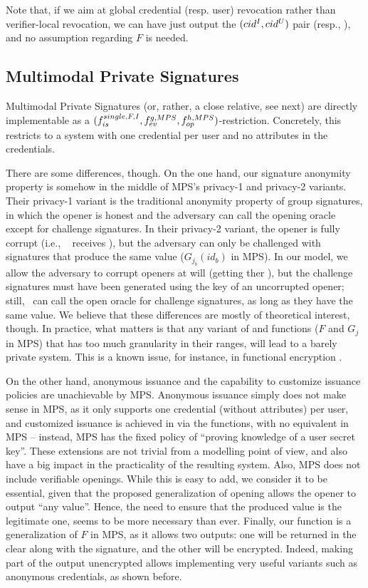 Note that, if we aim at global credential (resp. user) revocation rather than
verifier-local revocation, we can have \finsp just output the $(cid^I,cid^U)$
pair (resp., \upk), and no assumption regarding $F$ is needed.

\subsection{Multimodal Private Signatures}
\label{ssec:related-models-mps}

Multimodal Private Signatures (or, rather, a close relative, see next) are
directly implementable as a $(f_{is}^{single,F,I},f_{ev}^{g,MPS},
f_{op}^{h,MPS})$-\CUASGen restriction. Concretely, this restricts to a system
with one credential per user and no attributes in the credentials.

There are some differences, though. On the one hand, our signature anonymity
property is somehow in the middle of MPS's privacy-1 and privacy-2 variants.
Their privacy-1 variant is the traditional anonymity property of group
signatures, in which the opener is honest and the adversary can call the opening
oracle except for challenge signatures. In their privacy-2 variant, the opener
is fully corrupt (i.e., \adv~ receives \osk), but the adversary can only be
challenged with signatures that produce the same \yinsp value ($G_{j_b}(id_b)$
in MPS). In our \UAS model, we allow the adversary to corrupt openers at will
(getting ther \osk), but the challenge signatures must have been generated using
the key of an uncorrupted opener; still, \adv~can call the open oracle for
challenge signatures, as long as they have the same \yinsp value. We believe
that these differences are mostly of theoretical interest, though. In practice,
what matters is that any variant of \feval and \finsp functions ($F$ and $G_j$
in MPS) that has too much granularity in their ranges, will lead to a barely
private system. This is a known issue, for instance, in functional encryption
\cite{bsw11}.

On the other hand, anonymous issuance and the capability to customize issuance
policies are unachievable by MPS. Anonymous issuance simply does not make sense
in MPS, as it only supports one credential (without attributes) per user, and
customized issuance is achieved in \UAS via the \fissue functions, with no
equivalent in MPS -- instead, MPS has the fixed policy of
``proving knowledge of a user secret key''. These extensions are not trivial
from a modelling point of view, and also have a big impact in the practicality
of the resulting system. Also, MPS does not include verifiable openings. While
this is easy to add, we consider it to be essential, given that the proposed
generalization of opening allows the opener to output ``any value''. Hence, the
need to ensure that the produced value is the legitimate one, seems to be more
necessary than ever. Finally, our \feval function is a generalization of $F$ in
MPS, as it allows two outputs: one will be returned in the clear along with the
signature, and the other will be encrypted. Indeed, making part of the output
unencrypted allows implementing very useful variants such as anonymous
credentials, as shown before.

